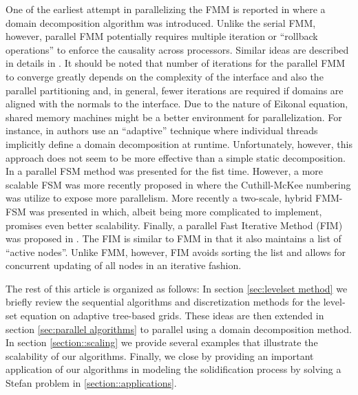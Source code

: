 One of the earliest attempt in parallelizing the FMM is reported in \cite{Herrmann:03:A-domain-decompositi} where a domain decomposition algorithm was introduced. Unlike the serial FMM, however, parallel FMM potentially requires multiple iteration or ``rollback operations'' to enforce the causality across processors. Similar ideas are described in details in \cite{Tugurlan:08:Fast-marching-method}. It should be noted that number of iterations for the parallel FMM to converge greatly depends on the complexity of the interface and also the parallel partitioning and, in general, fewer iterations are required if domains are aligned with the normals to the interface. Due to the nature of Eikonal equation, shared memory machines might be a better environment for parallelization. For instance, in \cite{Breus;Cristiani;Gwosdek;etal:11:An-adaptive-domain-d} authors use an ``adaptive'' technique where individual threads implicitly define a domain decomposition at runtime. Unfortunately, however, this approach does not seem to be more effective than a simple static decomposition. In \cite{Zhao:07:Parallel-implementat} a parallel FSM method was presented for the fist time. However, a more scalable FSM was more recently proposed in \cite{Detrixhe;Gibou;Min:13:A-parallel-fast-swee} where the Cuthill-McKee numbering was utilize to expose more parallelism. More recently a two-scale, hybrid FMM-FSM was presented in \cite{Chacon;Vladimirsky:13:A-parallel-Heap-Cell} which, albeit being more complicated to implement, promises even better scalability. Finally, a parallel Fast Iterative Method (FIM) was proposed in \cite{Jeong;Whitaker:08:A-fast-iterative-met}. The FIM is similar to FMM in that it also maintains a list of ``active nodes''. Unlike FMM, however, FIM avoids sorting the list and allows for concurrent updating of all nodes in an iterative fashion.

The rest of this article is organized as follows: In section \ref{sec:levelset method} we briefly review the sequential algorithms and discretization methods for the level-set equation on adaptive tree-based grids. These ideas are then extended in section \ref{sec:parallel algorithms} to parallel using a domain decomposition method. In section \ref{section::scaling} we provide several examples that illustrate the scalability of our algorithms. Finally, we close by providing an important application of our algorithms in modeling the solidification process by solving a Stefan problem in \ref{section::applications}.
